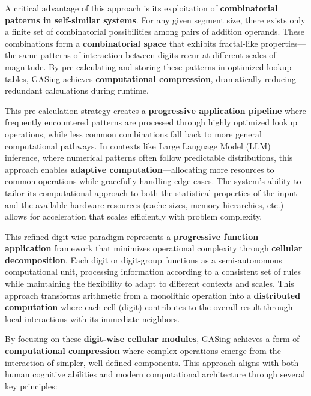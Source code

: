 A critical advantage of this approach is its exploitation of \textbf{combinatorial patterns in self-similar systems}. For any given segment size, there exists only a finite set of combinatorial possibilities among pairs of addition operands. These combinations form a \textbf{combinatorial space} that exhibits fractal-like properties—the same patterns of interaction between digits recur at different scales of magnitude. By pre-calculating and storing these patterns in optimized lookup tables, GASing achieves \textbf{computational compression}, dramatically reducing redundant calculations during runtime.

This pre-calculation strategy creates a \textbf{progressive application pipeline} where frequently encountered patterns are processed through highly optimized lookup operations, while less common combinations fall back to more general computational pathways. In contexts like Large Language Model (LLM) inference, where numerical patterns often follow predictable distributions, this approach enables \textbf{adaptive computation}—allocating more resources to common operations while gracefully handling edge cases. The system's ability to tailor its computational approach to both the statistical properties of the input and the available hardware resources (cache sizes, memory hierarchies, etc.) allows for acceleration that scales efficiently with problem complexity.

This refined digit-wise paradigm represents a \textbf{progressive function application} framework that minimizes operational complexity through \textbf{cellular decomposition}. Each digit or digit-group functions as a semi-autonomous computational unit, processing information according to a consistent set of rules while maintaining the flexibility to adapt to different contexts and scales. This approach transforms arithmetic from a monolithic operation into a \textbf{distributed computation} where each cell (digit) contributes to the overall result through local interactions with its immediate neighbors.

By focusing on these \textbf{digit-wise cellular modules}, GASing achieves a form of \textbf{computational compression} where complex operations emerge from the interaction of simpler, well-defined components. This approach aligns with both human cognitive abilities and modern computational architecture through several key principles:

